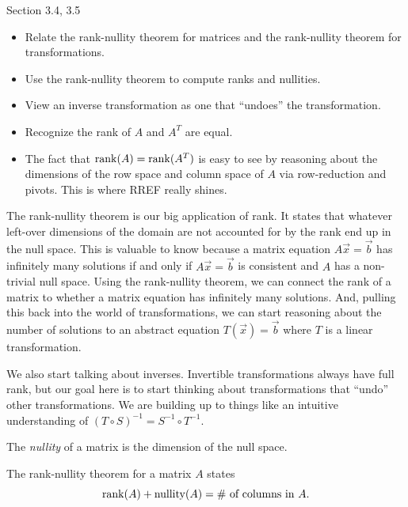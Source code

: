 \documentclass{problemset}
\newcommand{\bookonlynewpage}{\begin{bookonly}\newpage\end{bookonly}}
\begin{document}
\begin{lesson}

	Section 3.4, 3.5

	\begin{itemize}
		\item Relate the rank-nullity theorem for matrices and the rank-nullity theorem for transformations.
		\item Use the rank-nullity theorem to compute ranks and nullities.
		\item View an inverse transformation as one that ``undoes'' the transformation.
		\item Recognize the rank of $A$ and $A^T$ are equal.
	\end{itemize}

	\begin{annotation}
		\begin{notes}
			\begin{itemize}
				\item The fact that $\operatorname{rank}(A)=\operatorname{rank}(A^T)$ is easy to see by reasoning
					about the dimensions of the row space and column space of $A$
					via row-reduction and pivots. This is where RREF really shines.
			\end{itemize}
		\end{notes}
	\end{annotation}
	The rank-nullity theorem is our big application of rank. It states that whatever
	left-over dimensions of the domain are not accounted for by the rank end up in the null space.
	This is valuable to know because a matrix equation $A\vec x=\vec b$ has infinitely many
	solutions if and only if $A\vec x=\vec b$ is consistent and $A$ has a non-trivial null space. Using
	the rank-nullity theorem, we can connect the rank of a matrix to whether a matrix equation has infinitely
	many solutions. And, pulling this back into the world of transformations, we can start reasoning
	about the number of solutions to an abstract equation $T(\vec x)=\vec b$ where $T$ is a linear
	transformation.

	We also start talking about inverses. Invertible transformations always have full rank, but
	our goal here is to start thinking about transformations that ``undo'' other transformations. We
	are building up to things like an intuitive understanding of $(T\circ S)^{-1} = S^{-1}\circ T^{-1}$.

\end{lesson}
	\bookonlynewpage
	\begin{theorem}
	The \emph{nullity} of a matrix is the dimension of the null space.

	The rank-nullity theorem for a matrix $A$ states
	\[
		\operatorname{rank}(A)+\operatorname{nullity}(A) = \#\text{ of columns in }A.
	\]
	\end{theorem}
\end{document}
